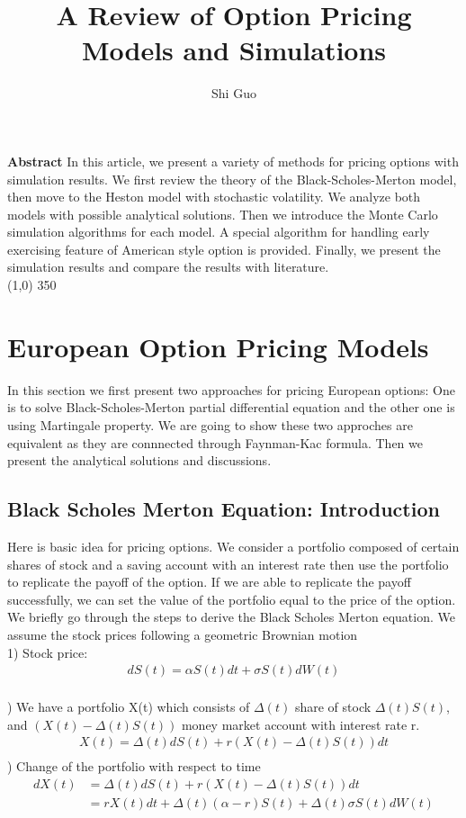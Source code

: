 \documentclass[a4paper]{article}
\title{A Review of Option Pricing Models and Simulations}
\author{Shi Guo}
\begin{document}
\maketitle
{\bf Abstract} In this article, we present a variety of methods for pricing options with simulation results. We first review the theory of the Black-Scholes-Merton model, then move to the Heston model with stochastic volatility. We analyze both models with possible analytical solutions. Then we introduce the Monte Carlo simulation algorithms for each model. A special algorithm for handling early exercising feature of American style option is provided. Finally, we present the simulation results and compare the results with literature.\\
\line(1,0) {350}
\section{European Option Pricing Models}
In this section we first present two approaches for pricing European options: One is to solve Black-Scholes-Merton partial differential equation and the other one is using Martingale property. We are going to show these two approches are equivalent as they are connnected through Faynman-Kac formula. Then we present the analytical solutions and discussions. 
\subsection{Black Scholes Merton Equation: Introduction}
Here is basic idea for pricing options. We consider a portfolio composed of certain shares of stock and a saving account with an interest rate then use the portfolio to replicate the payoff of the option. If we are able to replicate the payoff successfully, we can set the value of the portfolio equal to the price of the option. We briefly go through the steps to derive the Black Scholes Merton equation. We assume the stock prices following a geometric Brownian motion\\
1) Stock price:\\
\begin{align*}
	 dS(t) = \alpha S(t) dt + \sigma S(t) dW(t)\\
\end{align*}
 
) We have a portfolio X(t) which consists of $\Delta(t)$ share of stock  $\Delta(t) S(t)$, and $(X(t) - \Delta (t) S(t))$ money market account with interest rate r. \\  
\begin{align*}
	X(t) = \Delta(t) dS(t) + r(X(t) -\Delta(t) S(t)) dt\\
\end{align*}
) Change of the portfolio with respect to time
\begin{align*}
	  d X(t) & = \Delta(t) d S(t) + r(X(t) - \Delta(t) S(t)) dt \\
             & = r X(t) dt + \Delta(t) (\alpha - r )S(t) + \Delta (t) \sigma S(t) d W(t) \\
\end{align*}
                      
\end{document}
